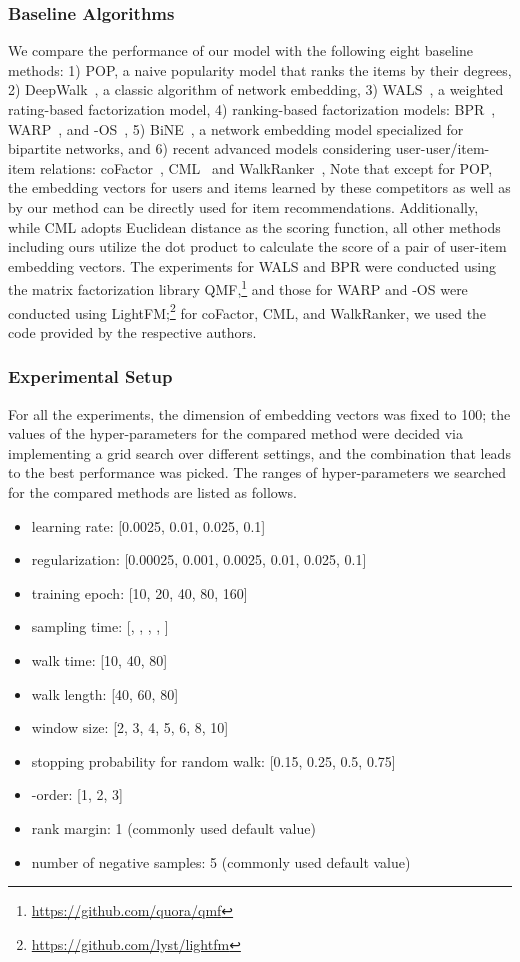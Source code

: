 \documentclass[sigconf,anonymous=false]{acmart}
\begin{document}
\subsubsection{Baseline Algorithms}
We compare the performance of our model with the following eight baseline
methods: 1) POP, a naive popularity model that ranks the items by their
degrees, 2) DeepWalk~\cite{dw}, a classic algorithm of network embedding, 3)
WALS~\cite{wals}, a weighted rating-based factorization model, 4) ranking-based
factorization models: BPR~\cite{bpr}, WARP~\cite{warp}, and -OS~\cite{kos},
5) BiNE~\cite{bine}, a network embedding model specialized for bipartite
networks, and 6) recent advanced models considering user-user/item-item
relations: coFactor~\cite{cofactor}, CML~\cite{cml} and
WalkRanker~\cite{walkranker}, Note that except for POP, the embedding vectors
for users and items learned by these competitors as well as by our method can
be directly used for item recommendations.
Additionally, while CML adopts Euclidean distance as the scoring
function, all other methods including ours utilize the dot product to calculate
the score of a pair of user-item embedding vectors.
The experiments for WALS and BPR were conducted using the matrix factorization
library QMF,\footnote{\url{https://github.com/quora/qmf}} and those for WARP
and -OS were conducted using LightFM;\footnote{\url{https://github.com/lyst/lightfm}}
for coFactor, CML, and WalkRanker, we used the code provided by the respective authors.


\subsubsection{Experimental Setup}
For all the experiments, the dimension of embedding vectors was fixed to 100;
the values of the hyper-parameters for the compared method were decided via
implementing a grid search over different settings, and the combination that
leads to the best performance was picked.
The ranges of hyper-parameters we searched for the compared methods are listed
as follows.
\begin{itemize}
    \item learning rate: [0.0025, 0.01, 0.025, 0.1]
    \item   regularization: [0.00025, 0.001, 0.0025, 0.01, 0.025, 0.1]
    \item   training epoch: [10, 20, 40, 80, 160]
    \item   sampling time: [, , , , ]
    \item   walk time: [10, 40, 80]
    \item   walk length: [40, 60, 80]
    \item   window size: [2, 3, 4, 5, 6, 8, 10]
    \item   stopping probability for random walk: [0.15, 0.25, 0.5, 0.75]
    \item   -order: [1, 2, 3]
    \item   rank margin: 1 (commonly used default value)
    \item   number of negative samples: 5 (commonly used default value)
\end{itemize}
\end{document}
